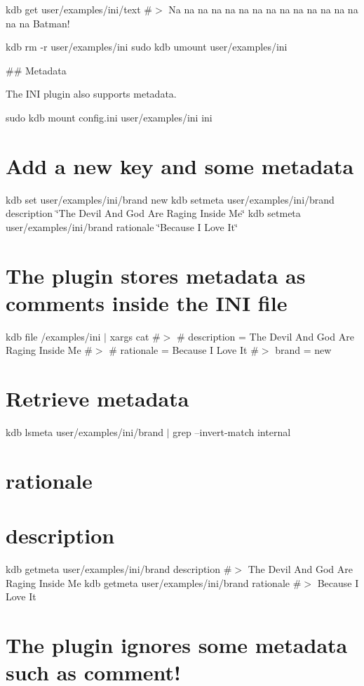 kdb get user/examples/ini/text \#$>$ Na na na na na na na na na na na na na na na na Batman!

kdb rm -\/r user/examples/ini sudo kdb umount user/examples/ini 
\begin{DoxyCode}
## Metadata

The INI plugin also supports metadata.
\end{DoxyCode}
 sudo kdb mount config.\+ini user/examples/ini ini

\section*{Add a new key and some metadata}

kdb set user/examples/ini/brand new kdb setmeta user/examples/ini/brand description \char`\"{}\+The Devil And God Are Raging Inside Me\char`\"{} kdb setmeta user/examples/ini/brand rationale \char`\"{}\+Because I Love It\char`\"{}

\section*{The plugin stores metadata as comments inside the I\+NI file}

kdb file /examples/ini $\vert$ xargs cat \#$>$ \# description = The Devil And God Are Raging Inside Me \#$>$ \# rationale = Because I Love It \#$>$ brand = new

\section*{Retrieve metadata}

kdb lsmeta user/examples/ini/brand $\vert$ grep --invert-\/match \textquotesingle{}internal\textquotesingle{} \section*{rationale}

\section*{description}

kdb getmeta user/examples/ini/brand description \#$>$ The Devil And God Are Raging Inside Me kdb getmeta user/examples/ini/brand rationale \#$>$ Because I Love It

\section*{The plugin ignores some metadata such as {\ttfamily comment}!}

